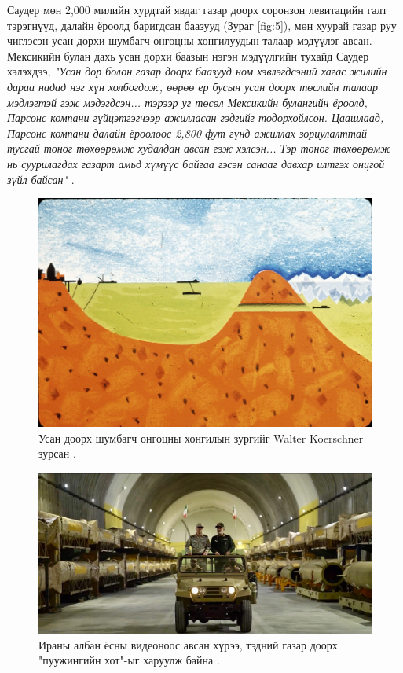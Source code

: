 \documentclass[10pt,twocolumn,letterpaper]{article}
\begin{document}
Саудер мөн 2,000 милийн хурдтай явдаг газар доорх соронзон левитацийн галт тэрэгнүүд, далайн ёроолд баригдсан баазууд (Зураг \ref{fig:5}), мөн хуурай газар руу чиглэсэн усан дорхи шумбагч онгоцны хонгилуудын талаар мэдүүлэг авсан. Мексикийн булан дахь усан дорхи баазын нэгэн мэдүүлгийн тухайд Саудер хэлэхдээ, \textit{"Усан дор болон газар доорх баазууд ном хэвлэгдсэний хагас жилийн дараа надад нэг хүн холбогдож, өөрөө ер бусын усан доорх төслийн талаар мэдлэгтэй гэж мэдэгдсэн... тэрээр уг төсөл Мексикийн булангийн ёроолд, Парсонс компани гүйцэтгэгчээр ажилласан гэдгийг тодорхойлсон. Цаашлаад, Парсонс компани далайн ёроолоос 2,800 фут гүнд ажиллах зориулалттай тусгай тоног төхөөрөмж худалдан авсан гэж хэлсэн... Тэр тоног төхөөрөмж нь суурилагдах газарт амьд хүмүүс байгаа гэсэн санааг давхар илтгэх онцгой зүйл байсан"} \cite{22}.
\begin{figure}[t]
\begin{center}
   \includegraphics[width=1\linewidth]{sub.jpg}
\end{center}
   \caption{Усан доорх шумбагч онгоцны хонгилын зургийг Walter Koerschner зурсан \cite{22,23}.}
\label{fig:6}
\label{fig:onecol}
\end{figure}
\begin{figure}[t]
\begin{center}
   \includegraphics[width=1\linewidth]{iran.jpeg}
\end{center}
   \caption{Ираны албан ёсны видеоноос авсан хүрээ, тэдний газар доорх "пуужингийн хот"-ыг харуулж байна \cite{39,40}.}
\label{fig:12}
\label{fig:onecol}
\end{figure}
\end{document}
